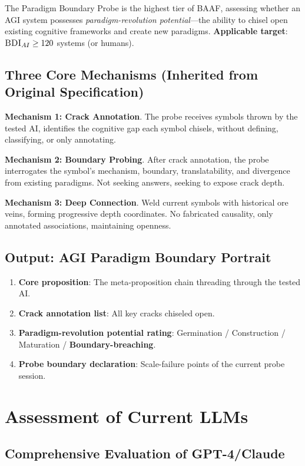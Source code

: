 \documentclass[11pt,a4paper]{article}
\theoremstyle{definition}
\theoremstyle{plain}
\newcommand{\BDI}{\textsc{BDI}}
\newcommand{\BAAF}{\textsc{BAAF}}
\begin{document}
The Paradigm Boundary Probe is the highest tier of \BAAF{}, assessing whether an AGI system possesses \textit{paradigm-revolution potential}---the ability to chisel open existing cognitive frameworks and create new paradigms. \textbf{Applicable target}: $\BDI_{AI} \geq 120$ systems (or humans).

\subsection{Three Core Mechanisms (Inherited from Original Specification)}

\textbf{Mechanism 1: Crack Annotation}. The probe receives symbols thrown by the tested AI, identifies the cognitive gap each symbol chisels, without defining, classifying, or only annotating.

\textbf{Mechanism 2: Boundary Probing}. After crack annotation, the probe interrogates the symbol's mechanism, boundary, translatability, and divergence from existing paradigms. Not seeking answers, seeking to expose crack depth.

\textbf{Mechanism 3: Deep Connection}. Weld current symbols with historical ore veins, forming progressive depth coordinates. No fabricated causality, only annotated associations, maintaining openness.

\subsection{Output: AGI Paradigm Boundary Portrait}

\begin{enumerate}
    \item \textbf{Core proposition}: The meta-proposition chain threading through the tested AI.
    \item \textbf{Crack annotation list}: All key cracks chiseled open.
    \item \textbf{Paradigm-revolution potential rating}: Germination / Construction / Maturation / \textbf{Boundary-breaching}.
    \item \textbf{Probe boundary declaration}: Scale-failure points of the current probe session.
\end{enumerate}

\section{Assessment of Current LLMs}
\label{sec:current-llms}

\subsection{Comprehensive Evaluation of GPT-4/Claude}
\end{document}
